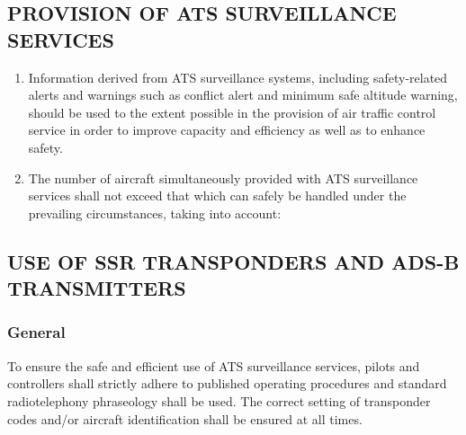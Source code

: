 \documentclass[../vATM.tex]{subfiles}
\begin{document}
    \subsection[Provision of ATS surveillance services]{PROVISION OF ATS SURVEILLANCE SERVICES}

    \begin{enumerate}[label=\arabic{section}.\arabic{subsection}.\arabic*]
        \item Information derived from ATS surveillance systems, including safety-related alerts and warnings such as conflict alert and minimum safe altitude warning, should be used to the extent possible in the provision of air traffic control service in order to improve capacity and efficiency as well as to enhance safety.
        \item The number of aircraft simultaneously provided with ATS surveillance services shall not exceed that which can safely be handled under the prevailing circumstances, taking into account:

    \end{enumerate}

    \subsection[Use of SSR transponders and ADS-B transmitters]{USE OF SSR TRANSPONDERS AND ADS-B TRANSMITTERS}

    \subsubsection{General}

    To ensure the safe and efficient use of ATS surveillance services, pilots and controllers shall strictly adhere to published operating procedures and standard radiotelephony phraseology shall be used. The correct setting of transponder codes and/or aircraft identification shall be ensured at all times.
\end{document}
